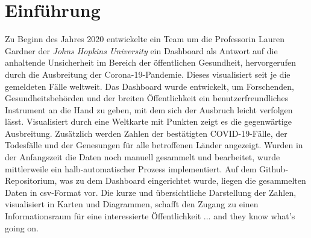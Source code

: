 \chapter{Einführung}
Zu Beginn des Jahres 2020 entwickelte ein Team um die Professorin Lauren Gardner der \textit{Johns Hopkins University} ein Dashboard 
als Antwort auf die anhaltende Unsicherheit im Bereich der öffentlichen Gesundheit, hervorgerufen durch die Ausbreitung der Corona-19-Pandemie. 
Dieses visualisiert seit je die gemeldeten Fälle weltweit. Das Dashboard wurde entwickelt, um Forschenden, Gesundheitsbehörden und der breiten Öffentlichkeit 
ein benutzerfreundliches Instrument an die Hand zu geben, mit dem sich der Ausbruch leicht verfolgen lässt.
Visualisiert durch eine Weltkarte mit Punkten zeigt es die gegenwärtige Ausbreitung.
Zusätzlich werden Zahlen der bestätigten COVID-19-Fälle, der Todesfälle und der Genesungen für alle betroffenen Länder angezeigt\cite[Vgl.][533]{dong_interactive_2020}.
Wurden in der Anfangszeit die Daten noch manuell gesammelt und bearbeitet, wurde mittlerweile ein halb-automatischer Prozess implementiert.
Auf dem Github-Repositorium, was zu dem Dashboard eingerichtet wurde, liegen die gesammelten Daten in csv-Format vor.
Die kurze und übersichtliche Darstellung der Zahlen, visualisiert in Karten und Diagrammen, schafft den Zugang zu einen Informationsraum für eine interessierte
Öffentlichkeit ... and they know what's going on.


